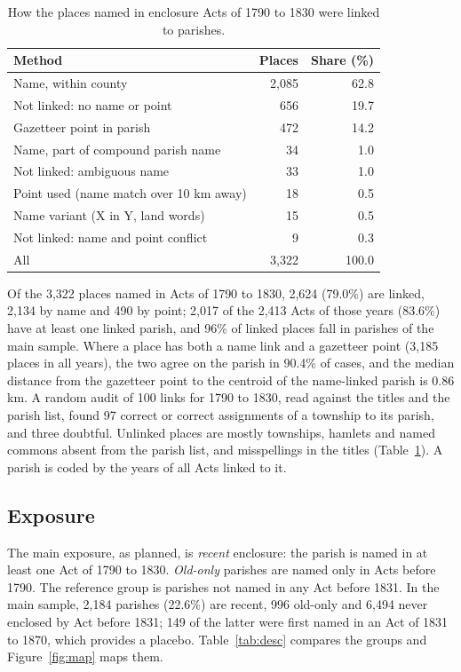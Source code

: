 \documentclass[11pt,a4paper]{article}
\begin{document}
\begin{table}[tbp]\centering\small\caption{How the places named in enclosure Acts of 1790 to 1830 were linked to parishes.}\label{tab:link}\begin{tabular}{lrr}\toprule Method & Places & Share (\%)\\\midrule
Name, within county & 2,085 & 62.8\\
Not linked: no name or point & 656 & 19.7\\
Gazetteer point in parish & 472 & 14.2\\
Name, part of compound parish name & 34 & 1.0\\
Not linked: ambiguous name & 33 & 1.0\\
Point used (name match over 10 km away) & 18 & 0.5\\
Name variant (X in Y, land words) & 15 & 0.5\\
Not linked: name and point conflict & 9 & 0.3\\
\midrule All & 3,322 & 100.0\\\bottomrule\end{tabular}\end{table}

Of the 3,322 places named in Acts of 1790 to 1830, 2,624 (79.0\%) are linked, 2,134 by name and 490 by point; 2,017 of the 2,413 Acts of those years (83.6\%) have at least one linked parish, and 96\% of linked places fall in parishes of the main sample. Where a place has both a name link and a gazetteer point (3,185 places in all years), the two agree on the parish in 90.4\% of cases, and the median distance from the gazetteer point to the centroid of the name-linked parish is 0.86 km. A random audit of 100 links for 1790 to 1830, read against the titles and the parish list, found 97 correct or correct assignments of a township to its parish, and three doubtful. Unlinked places are mostly townships, hamlets and named commons absent from the parish list, and misspellings in the titles (Table~\ref{tab:link}). A parish is coded by the years of all Acts linked to it.

\subsection{Exposure}
The main exposure, as planned, is \textit{recent} enclosure: the parish is named in at least one Act of 1790 to 1830. \textit{Old-only} parishes are named only in Acts before 1790. The reference group is parishes not named in any Act before 1831. In the main sample, 2,184 parishes (22.6\%) are recent, 996 old-only and 6,494 never enclosed by Act before 1831; 149 of the latter were first named in an Act of 1831 to 1870, which provides a placebo. Table~\ref{tab:desc} compares the groups and Figure~\ref{fig:map} maps them.
\end{document}
